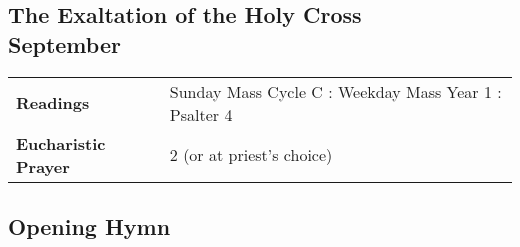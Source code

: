 \documentclass[12pt]{article}
\begin{document}
\begin{center}
\section*{The Exaltation of the Holy Cross\\ September}

\begin{tabular}{ |l|l| }
\hline
\textbf{Readings} & Sunday Mass Cycle C : Weekday Mass Year 1 : Psalter 4\\
\textbf{Eucharistic Prayer} & 2 (or at priest’s choice)\\
\hline
\end{tabular}
\end{center}

\begin{center}
\subsection*{Opening Hymn}
\end{center}
\end{document}
